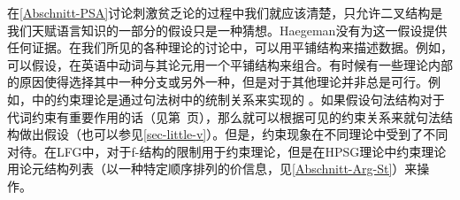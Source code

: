 在\ref{Abschnitt-PSA}讨论刺激贫乏论的过程中我们就应该清楚，只允许二叉结构是我们天赋语言知识的一部分的假设只是一种猜想。Haegeman没有为这一假设提供任何证据。在我们所见的各种理论的讨论中，可以用平铺结构来描述数据。例如，可以假设，在英语中动词与其论元用一个平铺结构来组合\citep[]{ps2}。有时候有一些理论内部的原因使得选择其中一种分支或另外一种，但是对于其他理论并非总是可行。例如，\gbtc 中的约束理论是通过句法树中的统制关系来实现的 \citep[]{Chomsky81a}。如果假设句法结构对于代词约束有重要作用的话（见第~\pageref{Seite-Bindungstheorie}页），那么就可以根据可见的约束关系来就句法结构做出假设（也可以参见\ref{sec-little-v}）。但是，约束现象在不同理论中受到了不同对待。在LFG\indexlfgc 中，对于f-结构的限制用于约束理论\citep{Dalrymple93a}，但是在HPSG\indexhpsgc 理论中约束理论用论元结构列表（以一种特定顺序排列的价信息，见\ref{Abschnitt-Arg-St}）来操作。
 
